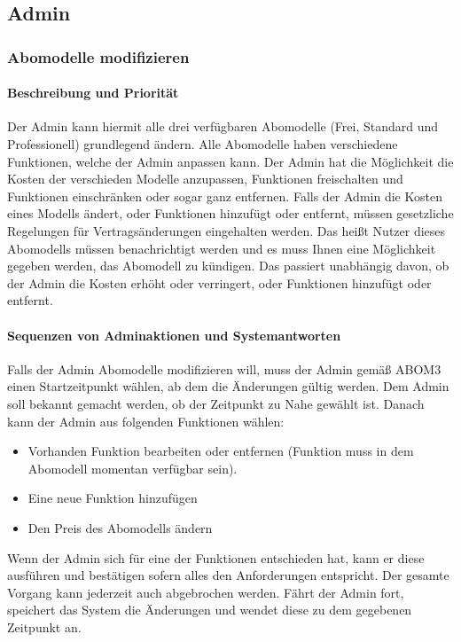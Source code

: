 \subsection{Admin}
\subsubsection{Abomodelle modifizieren}
\paragraph{Beschreibung und Priorität}
Der Admin kann hiermit alle drei verfügbaren Abomodelle (Frei, Standard und Professionell) grundlegend ändern. Alle Abomodelle haben verschiedene Funktionen, welche der Admin anpassen kann. Der Admin hat die Möglichkeit die Kosten der verschieden Modelle anzupassen, Funktionen freischalten und Funktionen einschränken oder sogar ganz entfernen. Falls der Admin die Kosten eines Modells ändert, oder Funktionen hinzufügt oder entfernt, müssen gesetzliche Regelungen für Vertragsänderungen eingehalten werden. Das heißt Nutzer dieses Abomodells müssen benachrichtigt werden und es muss Ihnen eine Möglichkeit gegeben werden, das Abomodell zu kündigen. Das passiert unabhängig davon, ob der Admin die Kosten erhöht oder verringert, oder Funktionen hinzufügt oder entfernt.
\paragraph{Sequenzen von Adminaktionen und Systemantworten}
Falls der Admin Abomodelle modifizieren will, muss der Admin gemäß ABOM3 einen Startzeitpunkt wählen, ab dem die Änderungen gültig werden. Dem Admin soll bekannt gemacht werden, ob der Zeitpunkt zu Nahe gewählt ist. Danach kann der Admin aus folgenden Funktionen wählen:
\begin{itemize}
	\item Vorhanden Funktion bearbeiten oder entfernen (Funktion muss in dem Abomodell momentan verfügbar sein).
	\item Eine neue Funktion hinzufügen
	\item Den Preis des Abomodells ändern
\end{itemize}
Wenn der Admin sich für eine der Funktionen entschieden hat, kann er diese ausführen und bestätigen sofern alles den Anforderungen entspricht. Der gesamte Vorgang kann jederzeit auch abgebrochen werden. Fährt der Admin fort, speichert das System die Änderungen und wendet diese zu dem gegebenen Zeitpunkt an.


